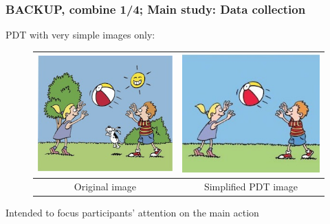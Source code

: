 \documentclass[handout,xcolor={dvipsnames}]{beamer}
\begin{document}
\begin{frame}
\frametitle{BACKUP, combine 1/4; Main study: Data collection}
\medskip

PDT with very simple images only:

\begin{figure}[htb!]
\begin{center}
\begin{tabular}{|c|c|}
\hline
{\includegraphics[width=0.38\columnwidth]{figures/throw-original.jpg}} & {\includegraphics[width=0.38\columnwidth]{figures/I21cropped.jpg}} \\
\hline
Original image & Simplified PDT image \\
\hline
\end{tabular}
\end{center}
\end{figure}

Intended to focus participants' attention on the main action
\end{frame}
\end{document}
